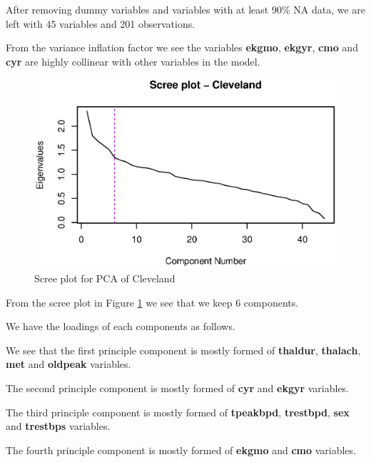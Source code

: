 \documentclass[a4paper]{article}
\begin{document}
After removing dummy variables and variables with at least $90\%$ NA data, we are left with 45 variables and 201 observations. 



From the variance inflation factor we see the variables \textbf{ekgmo}, \textbf{ekgyr}, \textbf{cmo} and \textbf{cyr} are highly collinear with other variables in the model.

\begin{figure}[H]
	\begin{center}
		\includegraphics[width=12cm]{question3output/clescreeplot.eps}
	\end{center}
	\caption{Scree plot for PCA of Cleveland}
	\label{q3-cle-screeplot}
\end{figure}

From the scree plot in Figure \ref{q3-cle-screeplot} we see that we keep 6 components.

We have the loadings of each components as follows.



We see that the first principle component is mostly formed of \textbf{thaldur}, \textbf{thalach}, \textbf{met} and \textbf{oldpeak} variables.

The second principle component is mostly formed of \textbf{cyr} and \textbf{ekgyr} variables.

The third principle component is mostly formed of \textbf{tpeakbpd}, \textbf{trestbpd}, \textbf{sex} and \textbf{trestbps} variables.

The fourth principle component is mostly formed of \textbf{ekgmo} and \textbf{cmo} variables.
\end{document}
